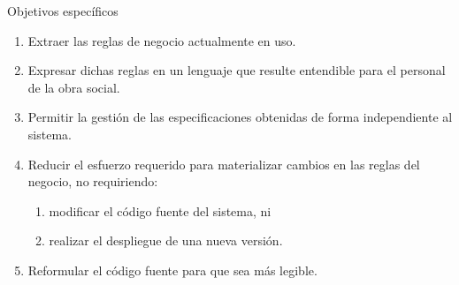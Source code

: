 \documentclass[10pt]{beamer}
\begin{document}
\begin{frame}{Objetivos específicos}
    \begin{enumerate}
        \item Extraer las reglas de negocio actualmente en uso.
        \item Expresar dichas reglas en un lenguaje que resulte entendible para el personal de la obra social.
        \item Permitir la gestión de las especificaciones obtenidas de forma independiente al sistema.
        \item Reducir el esfuerzo requerido para materializar cambios en las reglas del negocio, no requiriendo:
        \begin{enumerate}
            \item modificar el código fuente del sistema, ni
            \item realizar el despliegue de una nueva versión.
        \end{enumerate}
        \item Reformular el código fuente para que sea más legible.
    \end{enumerate}
\end{frame}

\end{document}
